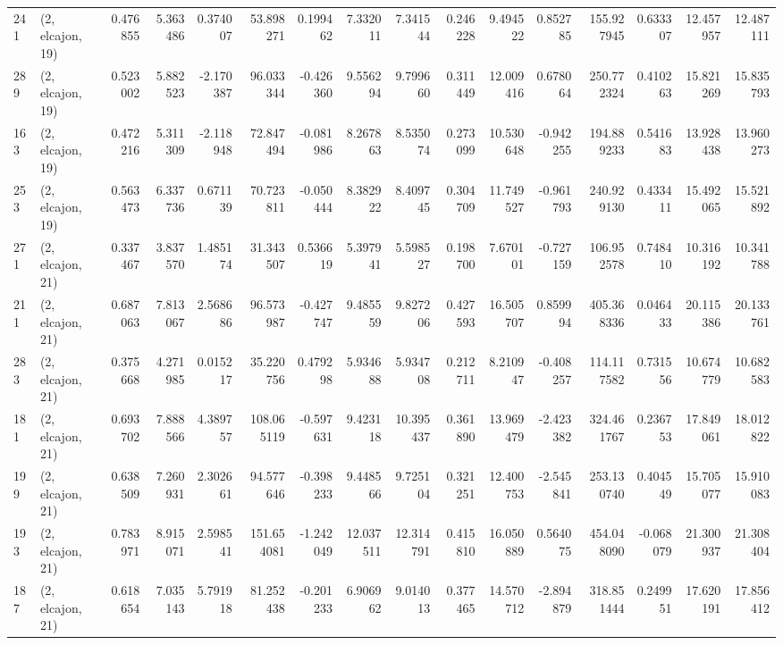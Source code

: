 \begin{tabular}{llrrrrrrrrrrrrrr}
241 &  (2, elcajon, 19) &   0.476855 &   5.363486 &   0.374007 &    53.898271 &   0.199462 &   7.332011 &   7.341544 &  0.246228 &   9.494522 &   0.852785 &   155.927945 &   0.633307 &  12.457957 &  12.487111 \\
289 &  (2, elcajon, 19) &   0.523002 &   5.882523 &  -2.170387 &    96.033344 &  -0.426360 &   9.556294 &   9.799660 &  0.311449 &  12.009416 &   0.678064 &   250.772324 &   0.410263 &  15.821269 &  15.835793 \\
163 &  (2, elcajon, 19) &   0.472216 &   5.311309 &  -2.118948 &    72.847494 &  -0.081986 &   8.267863 &   8.535074 &  0.273099 &  10.530648 &  -0.942255 &   194.889233 &   0.541683 &  13.928438 &  13.960273 \\
253 &  (2, elcajon, 19) &   0.563473 &   6.337736 &   0.671139 &    70.723811 &  -0.050444 &   8.382922 &   8.409745 &  0.304709 &  11.749527 &  -0.961793 &   240.929130 &   0.433411 &  15.492065 &  15.521892 \\
271 &  (2, elcajon, 21) &   0.337467 &   3.837570 &   1.485174 &    31.343507 &   0.536619 &   5.397941 &   5.598527 &  0.198700 &   7.670101 &  -0.727159 &   106.952578 &   0.748410 &  10.316192 &  10.341788 \\
211 &  (2, elcajon, 21) &   0.687063 &   7.813067 &   2.568686 &    96.573987 &  -0.427747 &   9.485559 &   9.827206 &  0.427593 &  16.505707 &   0.859994 &   405.368336 &   0.046433 &  20.115386 &  20.133761 \\
283 &  (2, elcajon, 21) &   0.375668 &   4.271985 &   0.015217 &    35.220756 &   0.479298 &   5.934688 &   5.934708 &  0.212711 &   8.210947 &  -0.408257 &   114.117582 &   0.731556 &  10.674779 &  10.682583 \\
181 &  (2, elcajon, 21) &   0.693702 &   7.888566 &   4.389757 &   108.065119 &  -0.597631 &   9.423118 &  10.395437 &  0.361890 &  13.969479 &  -2.423382 &   324.461767 &   0.236753 &  17.849061 &  18.012822 \\
199 &  (2, elcajon, 21) &   0.638509 &   7.260931 &   2.302661 &    94.577646 &  -0.398233 &   9.448566 &   9.725104 &  0.321251 &  12.400753 &  -2.545841 &   253.130740 &   0.404549 &  15.705077 &  15.910083 \\
193 &  (2, elcajon, 21) &   0.783971 &   8.915071 &   2.598541 &   151.654081 &  -1.242049 &  12.037511 &  12.314791 &  0.415810 &  16.050889 &   0.564075 &   454.048090 &  -0.068079 &  21.300937 &  21.308404 \\
187 &  (2, elcajon, 21) &   0.618654 &   7.035143 &   5.791918 &    81.252438 &  -0.201233 &   6.906962 &   9.014013 &  0.377465 &  14.570712 &  -2.894879 &   318.851444 &   0.249951 &  17.620191 &  17.856412 \\

\end{tabular}
